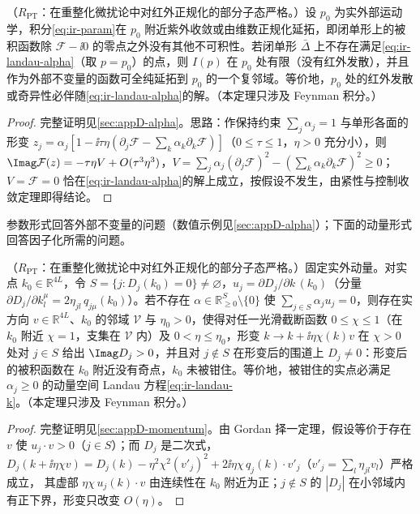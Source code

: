 \begin{theorem}\label{thm:ir-landau-alpha}
（$R_{\mathrm{PT}}$：在重整化微扰论中对红外正规化的部分子态严格。）设 $p_0$ 为实外部运动学，积分\cref{eq:ir-param}在 $p_0$ 附近紫外收敛或由维数正规化延拓，即闭单形上的被积函数除 $\mathcal F-\ii0$ 的零点之外没有其他不可积性。若闭单形 $\bar\Delta$ 上不存在满足\cref{eq:ir-landau-alpha}（取 $p=p_0$）的点，则 $I(p)$ 在 $p_0$ 处有限（没有红外发散），并且作为外部不变量的函数可全纯延拓到 $p_0$ 的一个复邻域。等价地，$p_0$ 处的红外发散或奇异性必伴随\cref{eq:ir-landau-alpha}的解。（本定理只涉及 Feynman 积分。）
\end{theorem}
\begin{proof}
完整证明见\cref{sec:appD-alpha}。思路：作保持约束 $\sum_j\alpha_j=1$ 与单形各面的形变 $z_j=\alpha_j[1-\ii\tau\eta(\partial_j\mathcal F-\sum_k\alpha_k\partial_k\mathcal F)]$（$0\le\tau\le1$，$\eta>0$ 充分小），则 $\Imag\mathcal F(z)=-\tau\eta V+O(\tau^3\eta^3)$，$V=\sum_j\alpha_j(\partial_j\mathcal F)^2-(\sum_k\alpha_k\partial_k\mathcal F)^2\ge0$；$V=\mathcal F=0$ 恰在\cref{eq:ir-landau-alpha}的解上成立，按假设不发生，由紧性与控制收敛定理即得结论。
\end{proof}

参数形式回答外部不变量的问题（数值示例见\cref{sec:appD-alpha}）；下面的动量形式回答因子化所需的问题。

\begin{theorem}\label{thm:ir-landau-momentum}
（$R_{\mathrm{PT}}$：在重整化微扰论中对红外正规化的部分子态严格。）固定实外动量。对实点 $k_0\in\mathbb R^{4L}$，令 $S=\{j:D_j(k_0)=0\}\ne\varnothing$，$u_j=\partial D_j/\partial k\,(k_0)$（分量 $\partial D_j/\partial k_l^\mu=2\eta_{jl}\,q_{j\mu}(k_0)$）。若不存在 $\alpha\in\mathbb R^S_{\ge0}\setminus\{0\}$ 使 $\sum_{j\in S}\alpha_ju_j=0$，则存在实方向 $v\in\mathbb R^{4L}$、$k_0$ 的邻域 $\mathcal V$ 与 $\eta_0>0$，使得对任一光滑截断函数 $0\le\chi\le1$（在 $k_0$ 附近 $\chi=1$，支集在 $\mathcal V$ 内）及 $0<\eta\le\eta_0$，形变 $k\to k+\ii\eta\chi(k)v$ 在 $\chi>0$ 处对 $j\in S$ 给出 $\Imag D_j>0$，并且对 $j\notin S$ 在形变后的围道上 $D_j\ne0$：形变后的被积函数在 $k_0$ 附近没有奇点，$k_0$ 未被钳住。等价地，被钳住的实点必满足 $\alpha_j\ge0$ 的动量空间 Landau 方程\cref{eq:ir-landau-k}。（本定理只涉及 Feynman 积分。）
\end{theorem}
\begin{proof}
完整证明见\cref{sec:appD-momentum}。由 Gordan 择一定理，假设等价于存在 $v$ 使 $u_j\cdot v>0$（$j\in S$）；而 $D_j$ 是二次式，
$D_j(k+\ii\eta\chi v)=D_j(k)-\eta^2\chi^2(v'_j)^2+2\ii\eta\chi\,q_j(k)\cdot v'_j$（$v'_j=\sum_l\eta_{jl}v_l$）严格成立，
其虚部 $\eta\chi\,u_j(k)\cdot v$ 由连续性在 $k_0$ 附近为正；$j\notin S$ 的 $|D_j|$ 在小邻域内有正下界，形变只改变 $O(\eta)$。
\end{proof}

